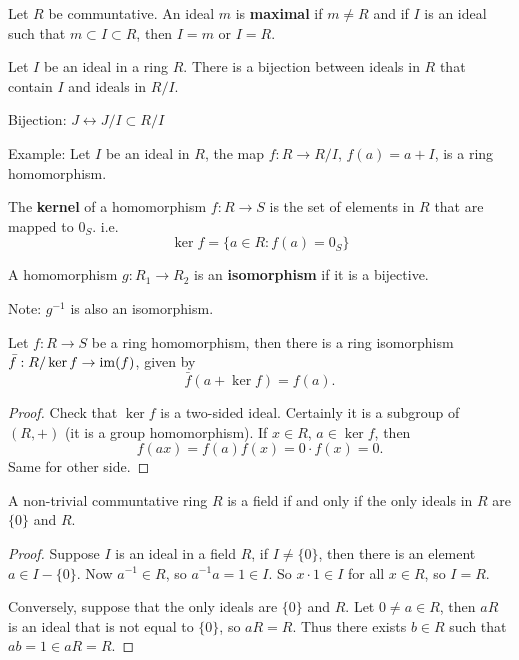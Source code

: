   \begin{define}
    Let $R$ be communtative. An ideal $m$ is \textbf{maximal} if $m \neq R$
    and if $I$ is an ideal such that $m \subset I \subset R$, then $I = m$ or
    $I = R$.
  \end{define}

  \begin{prop}\label{rings:quo_bij}
    Let $I$ be an ideal in a ring $R$. There is a bijection between ideals in
    $R$ that contain $I$ and ideals in $R/I$.
  \end{prop}

  Bijection: $ J \longleftrightarrow J/I \subset R/I $

  Example: Let $I$ be an ideal in $R$, the map $f: R \to R/I$,
  $f(a) = a + I$, is a ring homomorphism.

  \begin{define}
    The \textbf{kernel} of a homomorphism $f:R\to S$ is the set of elements in
    $R$ that are mapped to $0_S$. i.e.
    \[ \ker f = \{ a \in R : f(a) = 0_S \} \]
  \end{define}

  \begin{define}
    A homomorphism $g: R_1 \to R_2$ is an \textbf{isomorphism} if it is a
    bijective.
  \end{define}

  Note: $g^{-1}$ is also an isomorphism.

  \begin{prop}
    Let $f: R \to S$ be a ring homomorphism, then there is a ring isomorphism
    $\bar{f}: R/\ker{f} \to \operatorname{im}(f)$, given by
    \[ \bar{f}(a+\ker{f}) = f(a). \]
  \end{prop}

  \begin{proof}
    Check that $\ker{f}$ is a two-sided ideal. Certainly it is a subgroup of
    $(R, +)$ (it is a group homomorphism). If $x \in R$, $a \in \ker{f}$, then
    \[f(ax) = f(a)f(x) = 0\cdot f(x) = 0.\]
    Same for other side.
  \end{proof}

  \begin{lemma}
    A non-trivial communtative ring $R$ is a field if and only if the only
    ideals in $R$ are $\{0\}$ and $R$.
  \end{lemma}

  \begin{proof}
    Suppose $I$ is an ideal in a field $R$, if $I \neq \{0\}$, then there is
    an element $a\in I-\{0\}$. Now $a^{-1} \in R$, so $a^{-1}a = 1 \in I$. So
    $x\cdot 1 \in I$ for all $x \in R$, so $I = R$.

    Conversely, suppose that the only ideals are $\{0\}$ and $R$. Let
    $0 \neq a \in R$, then $aR$ is an ideal that is not equal to $\{0\}$, so
    $aR = R$. Thus there exists $b \in R$ such that $ab = 1 \in aR = R$.
  \end{proof}


